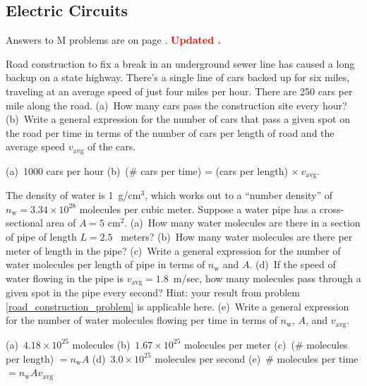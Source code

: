 \subsection{Electric Circuits} 


Answers to M problems are on page \pageref{circuit_prob_answers}.  \textbf{\textcolor{red}{Updated \DTMnow.}}

\begin{Exercise}
\label{road_construction_problem}
Road construction to fix a break in an underground sewer line has caused a long backup on a state highway.  There's a single line of cars backed up for six miles, traveling at an average speed of just four miles per hour.  There are 250 cars per mile along the road.  
(a)~How many cars pass the construction site every hour?  
(b)~Write a general expression for the number of cars that pass a given spot on the road per time in terms of the number of cars per length of road and the average speed $v_\text{avg}$ of the cars.
\end{Exercise}
\begin{Answer}
(a)~1000 cars per hour 
(b)~(\# cars per time) = (cars per length) $\times~v_\text{avg}$.\end{Answer}


\begin{Exercise}
The density of water is 1~g/cm$^3$, which works out to a ``number density'' of $n_\text{w}=3.34 \times 10^{28}$ molecules per cubic meter.  Suppose a water pipe has a cross-sectional area of $A=5 \text{~cm}^2$.  
(a)~How many water molecules are there in a section of pipe of length $L=2.5$~ meters?  
(b)~How many water molecules are there per meter of length in the pipe?  
(c)~Write a general expression for the number of water molecules per length of pipe in terms of $n_\text{w}$ and $A$.  
(d)~If the speed of water flowing in the pipe is $v_\text{avg}=1.8$~m/sec, how many molecules pass through a given spot in the pipe every second?  Hint: your result from problem \ref{road_construction_problem} is applicable here.  
(e)~Write a general expression for the number of water molecules flowing per time in terms of $n_\text{w}$, $A$, and $v_\text{avg}$.
\end{Exercise}
\begin{Answer}
(a)~$4.18  \times 10^{25}$ molecules 
(b)~$1.67 \times 10^{25}$ molecules per meter 
(c)~(\# molecules per length) $= n_\text{w} A$  
(d)~$3.0 \times 10^{25}$ molecules per second  
(e)~\# molecules per time $= n_\text{w} Av_\text{avg}$
\end{Answer}


